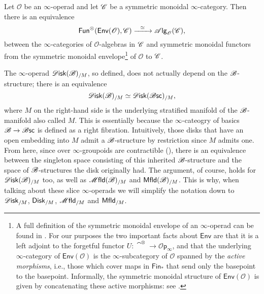 \documentclass[../text]{subfiles}
\begin{document}
\begin{proposition}\label{NBR8AQB}
    Let $\mathscr{O}$ be an $\infty$-operad and let $\mathscr{C}$ be a symmetric monoidal $\infty$-category. Then there is an equivalence
    \begin{equation}
        \mathsf{Fun}^\otimes (\mathsf{Env}(\mathscr{O}), \mathscr{C}) \xrightarrow{\ \ \simeq \ \ } \mathscr{A} \mathsf{lg}_{\mathscr{O}} (\mathscr{C}),
    \end{equation}
    between the $\infty$-categories of $\mathscr{O}$-algebras in $\mathscr{C}$ and symmetric monoidal functors from the symmetric monoidal envelope\footnote{A full definition of the symmetric monoidal envelope of an $\infty$-operad can be found in \cite[§2.2.4]{lurie_ha}. For our purposes the two important facts about $\mathsf{Env}$ are that it is a left adjoint to the forgetful functor $U: \cat^\otimes \xrightarrow{} \mathscr{O}\mathsf{p}_{\infty}$, and that the underlying $\infty$-category of $\mathsf{Env} (\mathscr{O})$ is the $\infty$-subcategory of $\mathscr{O}$ spanned by the \emph{active morphisms}, i.e., those which cover maps in $\mathsf{Fin}_\ast$ that send only the basepoint to the basepoint. Informally, the symmetric monoidal structure of $\mathsf{Env}(\mathscr{O})$ is given by concatenating these active morphisms: see \cite[Remark 2.2.4.3/6]{lurie_ha}.} of $\mathscr{O}$ to $\mathscr{C}$.
\end{proposition}

\begin{remark}\label{rem:disk_b=disk_bsc}
    The $\infty$-operad $\disk(\bstr)_{/M}$, so defined, does not actually depend on the $\mathscr{B}$-structure; there is an equivalence
    \begin{equation}
        \disk(\bstr)_{/M} \simeq \disk(\bsc)_{/M},
    \end{equation}
    where $M$ on the right-hand side is the underlying stratified manifold of the $\mathscr{B}$-manifold also called $M$. This is essentially because the $\infty$-cateogry of basics $\mathscr{B} \xrightarrow{} \mathscr{B} \mathsf{sc}$ is defined as a right fibration. Intuitively, those disks that have an open embedding into $M$ admit a $\mathscr{B}$-structure by restriction since $M$ admits one. From here, since over $\infty$-groupoids are contractible (\cite[\href{https://kerodon.net/tag/018Y}{018Y}]{lurie_kerodon}), there is an equivalence between the singleton space consisting of this inherited $\mathscr{B}$-structure and the space of $\mathscr{B}$-structures the disk originally had. The argument, of course, holds for $\disk(\bstr)_{/M}$ too, as well as $\mfld(\bstr)_{/M}$ and $\mfld[r](\bstr)_{/M}$. This is why, when talking about these slice $\infty$-operads we will simplify the notation down to $\disk_{/M}$, $\disk[r]_{/M}$, $\mfld_{/M}$ and $\mfld[r]_{/M}$.
\end{remark}
\end{document}
